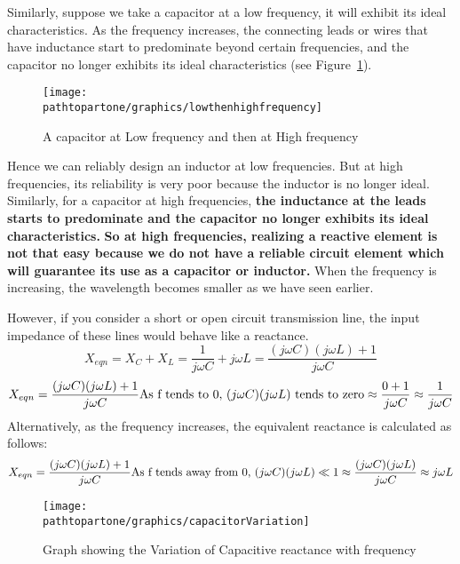 Similarly, suppose we take a capacitor at a low frequency, it will exhibit its ideal characteristics. As the frequency increases, the connecting leads or wires that have inductance start to predominate beyond certain frequencies, and the capacitor no longer exhibits its ideal characteristics (see Figure~\ref{fig:lowthenhighfrequency}).
\begin{figure}[h]
\centering
\texttt{[image: \\pathtopartone/graphics/lowthenhighfrequency]}
\caption{A capacitor at Low frequency and then at High frequency}
\label{fig:lowthenhighfrequency}
\end{figure}

Hence we can reliably design an inductor at low frequencies. But at high frequencies, its reliability is very poor because the inductor is no longer ideal. Similarly, for a capacitor at high frequencies, \textbf{the inductance at the leads starts to predominate and the capacitor no longer exhibits its ideal characteristics.} \textbf{So at high frequencies, realizing a reactive element is not that easy because we do not have a reliable circuit element which will guarantee its use as a capacitor or inductor.} When the frequency is increasing, the wavelength becomes smaller as we have seen earlier. 

However, if you consider a short or open circuit transmission line, the input impedance of these lines would behave like a reactance.
\begin{dmath*}
X_{eqn} = {X_C} + {X_L}
=  \frac{1}{j\omega C} + j\omega L
= \frac{(j\omega C)(j\omega L) + 1}{j\omega C}
\end{dmath*}
\begin{dmath*}	
X_{eqn} = \frac{(j\omega C)(j\omega L) + 1}{j\omega C}\newline
\text{As f tends to 0, $(j\omega C)(j\omega L)$ tends to zero} 
\approx\frac{0 + 1}{j\omega C}
\approx\frac{1}{j\omega C}
\end{dmath*}
Alternatively, as the frequency increases, the equivalent reactance is calculated as follows:
\begin{dmath*}
X_{eqn} = \frac{(j\omega C)(j\omega L) + 1}{j\omega C}\newline
\text{As f tends away from 0, $(j\omega C)(j\omega L) \ll 1$}
\approx\frac{(j\omega C)(j\omega L)}{j\omega C}
\approx j\omega L
\end{dmath*}
\begin{figure}[h]
\centering
\texttt{[image: \\pathtopartone/graphics/capacitorVariation]}
\caption{Graph showing the Variation of Capacitive reactance with frequency}
\label{fig:capacitorVariation}
\end{figure}

